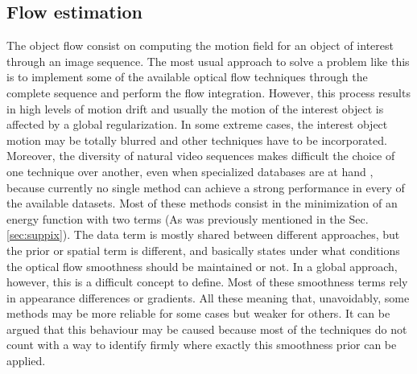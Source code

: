 \subsection{Flow estimation}
\label{sec:core}

The object flow consist on computing the motion field for an object of interest through an image
sequence. The most usual approach to solve a problem like this is to implement some of the available
optical flow techniques through the complete sequence and perform the flow integration. 
However, this process results in high levels of motion drift \cite{c18}\cite{c19} and usually the motion of the interest
object is affected by a global regularization. In some extreme cases, the interest object motion
may be totally blurred and other techniques have to be incorporated. Moreover, the diversity
of natural video sequences makes difficult the choice of one technique over another, even when specialized
databases are at hand \cite{c17}, because currently no single method can achieve a strong 
performance in every of the available datasets. Most of these methods consist in the minimization 
of an energy function with two terms (As was previously mentioned in the Sec. \ref{sec:suppix}). The data
term is mostly shared between different approaches, but the prior or spatial term is different, and basically states 
under what conditions the optical flow smoothness should be maintained or not. In a global approach, however,
this is a difficult concept to define. Most of these smoothness terms rely in appearance differences or gradients.
All these meaning that, unavoidably, some methods may be more reliable for some cases but weaker for others. 
It can be argued that this behaviour may be caused because most of the techniques do not count with a way to identify 
firmly where exactly this smoothness prior can be applied. 


